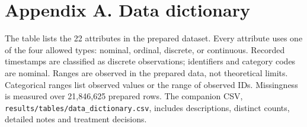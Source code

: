 \documentclass[10pt,a4paper]{article}
\renewcommand{\arraystretch}{1.25}
\newcommand{\code}[1]{\texttt{#1}}
\begin{document}
\section*{Appendix A. Data dictionary}
The table lists the 22 attributes in the prepared dataset. Every attribute uses one of the four allowed types: nominal, ordinal, discrete, or continuous. Recorded timestamps are classified as discrete observations; identifiers and category codes are nominal. Ranges are observed in the prepared data, not theoretical limits. Categorical ranges list observed values or the range of observed IDs. Missingness is measured over 21,846,625 prepared rows. The companion CSV, \code{results/tables/data\_dictionary.csv}, includes descriptions, distinct counts, detailed notes and treatment decisions.
\scriptsize
\setlength{\tabcolsep}{3.5pt}
\renewcommand{\arraystretch}{1.10}
\end{document}
